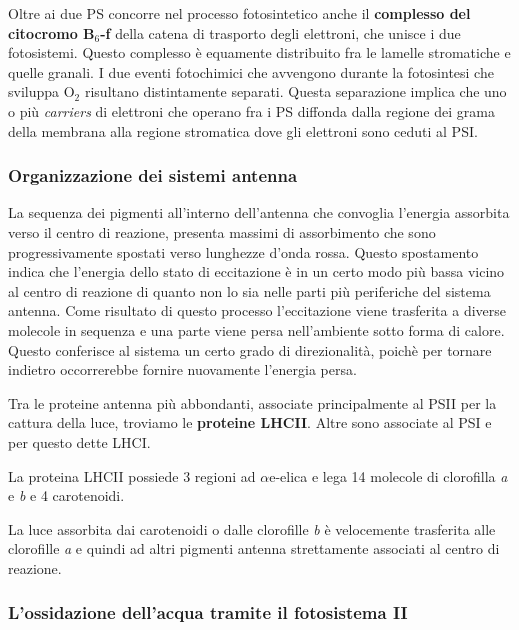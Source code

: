 \documentclass[]{article}
\begin{document}
Oltre ai due PS concorre nel processo fotosintetico anche il
\textbf{complesso del citocromo B$_6$-f} della catena di trasporto degli
elettroni, che unisce i due fotosistemi. Questo complesso è equamente
distribuito fra le lamelle stromatiche e quelle granali. I due eventi
fotochimici che avvengono durante la fotosintesi che sviluppa O$_2$
risultano distintamente separati. Questa separazione implica che uno o
più \emph{carriers} di elettroni che operano fra i PS diffonda dalla
regione dei grama della membrana alla regione stromatica dove gli
elettroni sono ceduti al PSI.

\subsubsection{Organizzazione dei sistemi
antenna}\label{organizzazione-dei-sistemi-antenna}

La sequenza dei pigmenti all'interno dell'antenna che convoglia
l'energia assorbita verso il centro di reazione, presenta massimi di
assorbimento che sono progressivamente spostati verso lunghezze d'onda
rossa. Questo spostamento indica che l'energia dello stato di
eccitazione è in un certo modo più bassa vicino al centro di reazione di
quanto non lo sia nelle parti più periferiche del sistema antenna. Come
risultato di questo processo l'eccitazione viene trasferita a diverse
molecole in sequenza e una parte viene persa nell'ambiente sotto forma
di calore. Questo conferisce al sistema un certo grado di direzionalità,
poichè per tornare indietro occorrerebbe fornire nuovamente l'energia
persa.

Tra le proteine antenna più abbondanti, associate principalmente al PSII
per la cattura della luce, troviamo le \textbf{proteine LHCII}. Altre
sono associate al PSI e per questo dette LHCI.

La proteina LHCII possiede 3 regioni ad $\alpha$e-elica e lega 14
molecole di clorofilla \emph{a} e \emph{b} e 4 carotenoidi.

La luce assorbita dai carotenoidi o dalle clorofille \emph{b} è
velocemente trasferita alle clorofille \emph{a} e quindi ad altri
pigmenti antenna strettamente associati al centro di reazione.

\subsubsection{L'ossidazione dell'acqua tramite il fotosistema
II}\label{lossidazione-dellacqua-tramite-il-fotosistema-ii}
\end{document}
